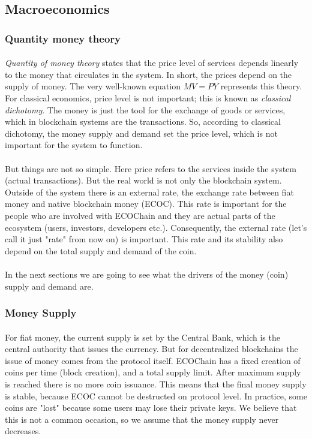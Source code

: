 \documentclass{article}
\begin{document}
\subsection{Macroeconomics}
\subsubsection{Quantity money theory}
\paragraph{}
\emph{Quantity of money theory} states that the price level of services depends linearly to the money that circulates in the system. In short, the prices depend on the supply of money. The very well-known equation $MV=PY$ represents this theory.
For classical economics, price level is not important; this is known as \emph{classical dichotomy}. The money is just the tool for the exchange of goods or services, which in blockchain systems are the transactions. So, according to classical dichotomy, the money supply and demand set the price level, which is not important for the system to function.
\paragraph{}
But things are not so simple. Here price refers to the services inside the system (actual transactions). But the real world is not only the blockchain system. Outside of the system there is an external rate, the exchange rate between fiat money and native blockchain money (ECOC). This rate is important for the people who are involved with ECOChain and they are actual parts of the ecosystem (users, investors, developers etc.). Consequently, the external rate (let's call it just "rate" from now on) is important. This rate and its stability also depend on the total supply and demand of the coin.
\paragraph{}
In the next sections we are going to see what the drivers of the money (coin) supply and demand are.

\subsubsection{Money Supply}
\paragraph{}
For fiat money, the current supply is set by the Central Bank, which is the central authority that issues the currency. But for decentralized blockchains the issue of money comes from the protocol itself. ECOChain has a fixed creation of coins per time (block creation), and a total supply limit. After maximum supply is reached there is no more coin issuance. This means that the final money supply is stable, because ECOC cannot be destructed on protocol level. In practice, some coins are "lost" because some users may lose their private keys. We believe that this is not a common occasion, so we assume that the money supply never decreases.
\end{document}
